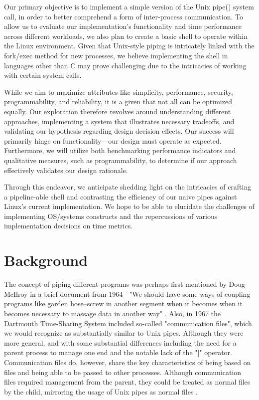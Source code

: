 Our primary objective is to implement a simple version of the Unix pipe() system call, in order to better comprehend a form of inter-process communication. To allow us to evaluate our implementation's functionality and time performance across different workloads, we also plan to create a basic shell to operate within the Linux environment. Given that Unix-style piping is intricately linked with the fork/exec method for new processes, we believe implementing the shell in languages other than C may prove challenging due to the intricacies of working with certain system calls. 

While we aim to maximize attributes like simplicity, performance, security, programmability, and reliability, it is a given that not all can be optimized equally. Our exploration therefore revolves around understanding different approaches, implementing a system that illustrates necessary tradeoffs, and validating our hypothesis regarding design decision effects. Our success will primarily hinge on functionality—our design must operate as expected. Furthermore, we will utilize both benchmarking performance indicators and qualitative measures, such as programmability, to determine if our approach effectively validates our design rationale. 

Through this endeavor, we anticipate shedding light on the intricacies of crafting a pipeline-able shell and contrasting the efficiency of our naive pipes against Linux's current implementation.  We hope to be able to elucidate the challenges of implementing OS/systems constructs and the repercussions of various implementation decisions on time metrics.

\section{Background}

The concept of piping different programs was perhaps first mentioned by Doug McIlroy in a brief document from 1964 - "We should have some ways of coupling programs like garden hose--screw in another segment when it becomes when it becomes necessary to massage data in another way" \cite{mcilroy}.  Also, in 1967 the Dartmouth Time-Sharing System included so-called "communication files", which we would recognize as substantially similar to Unix pipes. Although they were more general, and with some substantial differences including the need for a parent process to manage one end and the notable lack of the "|" operator. Communication files do, however, share the key characteristics of being based on files and being able to be passed to other processes. Although communication files required management from the parent, they could be treated as normal files by the child, mirroring the usage of Unix pipes as normal files \cite{mcilroydartmouth}. 

